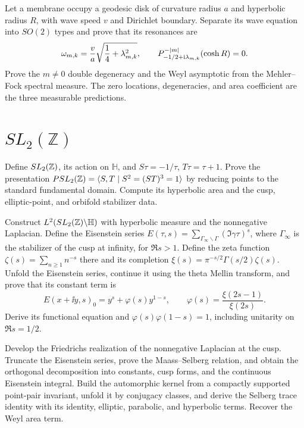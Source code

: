 \begin{exercise}
Let a membrane occupy a geodesic disk of curvature radius $a$ and hyperbolic
radius $R$, with wave speed $v$ and Dirichlet boundary.  Separate its wave
equation into $SO(2)$ types and prove that its resonances are
\[
 \omega_{m,k}=\frac va\sqrt{\frac14+\lambda_{m,k}^2},
 \qquad
 P_{-1/2+\mathrm i\lambda_{m,k}}^{-\left\lvert m\right\rvert}(\cosh R)=0.
\]
Prove the $m\ne0$ double degeneracy and the Weyl asymptotic from the
Mehler--Fock spectral measure.  The zero locations, degeneracies, and area
coefficient are the three measurable predictions.
\end{exercise}

\section{\texorpdfstring{$SL_2(\mathbb Z)$}{SL2(Z)}}

\begin{exercise}
Define $SL_2(\mathbb Z)$, its action on $\mathbb H$, and
$S\tau=-1/\tau$, $T\tau=\tau+1$.  Prove the presentation
$PSL_2(\mathbb Z)=\langle S,T\mid S^2=(ST)^3=1\rangle$ by reducing points to the
standard fundamental domain.  Compute its hyperbolic area and the cusp,
elliptic-point, and orbifold stabilizer data.
\end{exercise}

\begin{exercise}
Construct $L^2(SL_2(\mathbb Z)\backslash\mathbb H)$ with hyperbolic measure and the
nonnegative Laplacian.  Define the Eisenstein series
$E(\tau,s)=\sum_{\Gamma_\infty\backslash\Gamma}(\Im\gamma\tau)^s$, where
$\Gamma_\infty$ is the stabilizer of the cusp at infinity, for $\Re s>1$.
Define the zeta function $\zeta(s)=\sum_{n\geq1}n^{-s}$ there and its
completion $\xi(s)=\pi^{-s/2}\Gamma(s/2)\zeta(s)$.  Unfold the Eisenstein
series, continue it using the theta Mellin transform, and prove that its
constant term is
\[
 E(x+\ii y,s)_0=y^s+\varphi(s)y^{1-s},\qquad
 \varphi(s)=\frac{\xi(2s-1)}{\xi(2s)}.
\]
Derive its functional equation and
$\varphi(s)\varphi(1-s)=1$, including unitarity on $\Re s=1/2$.
\end{exercise}

\begin{exercise}
Develop the Friedrichs realization of the nonnegative Laplacian at the cusp.
Truncate the Eisenstein series, prove the Maass--Selberg relation, and obtain
the orthogonal decomposition into constants, cusp forms, and the continuous
Eisenstein integral.  Build the automorphic kernel from a compactly supported
point-pair invariant, unfold it by conjugacy classes, and derive the Selberg
trace identity with its identity, elliptic, parabolic, and hyperbolic terms.
Recover the Weyl area term.
\end{exercise}

